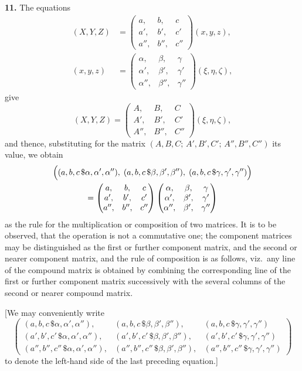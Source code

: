 \documentclass[12pt,a4paper]{article}
\theoremstyle{definition}
\begin{document}
\medskip
\noindent\textbf{11.} The equations
\begin{align*}
(X,Y,Z) &= \begin{pmatrix} a, & b, & c \\ a', & b', & c' \\ a'', & b'', & c'' \end{pmatrix}(x,y,z), \\
(x,y,z) &= \begin{pmatrix} \alpha, & \beta, & \gamma \\ \alpha', & \beta', & \gamma' \\ \alpha'', & \beta'', & \gamma'' \end{pmatrix}(\xi,\eta,\zeta),
\end{align*}
give
\[
(X,Y,Z) = \begin{pmatrix} A, & B, & C \\ A', & B', & C' \\ A'', & B'', & C'' \end{pmatrix}(\xi,\eta,\zeta),
\]
and thence, substituting for the matrix $(A,B,C;\, A',B',C';\, A'',B'',C'')$ its value, we obtain
\begin{multline*}
\Bigl((a,b,c\,\$\alpha,\alpha',\alpha''),\; (a,b,c\,\$\beta,\beta',\beta''),\; (a,b,c\,\$\gamma,\gamma',\gamma'')\Bigr) \\
= \begin{pmatrix} a, & b, & c \\ a', & b', & c' \\ a'', & b'', & c'' \end{pmatrix}
\begin{pmatrix} \alpha, & \beta, & \gamma \\ \alpha', & \beta', & \gamma' \\ \alpha'', & \beta', & \gamma'' \end{pmatrix}
\end{multline*}
as the rule for the multiplication or composition of two matrices. It is to be observed, that the operation is not a commutative one; the component matrices may be distinguished as the first or further component matrix, and the second or nearer component matrix, and the rule of composition is as follows, viz.\ any line of the compound matrix is obtained by combining the corresponding line of the first or further component matrix successively with the several columns of the second or nearer compound matrix.

[We may conveniently write
\[
\begin{pmatrix}
(a,b,c\,\$\alpha,\alpha',\alpha''), & (a,b,c\,\$\beta,\beta',\beta''), & (a,b,c\,\$\gamma,\gamma',\gamma'') \\
(a',b',c'\,\$\alpha,\alpha',\alpha''), & (a',b',c'\,\$\beta,\beta',\beta''), & (a',b',c'\,\$\gamma,\gamma',\gamma'') \\
(a'',b'',c''\,\$\alpha,\alpha',\alpha''), & (a'',b'',c''\,\$\beta,\beta',\beta''), & (a'',b'',c''\,\$\gamma,\gamma',\gamma'')
\end{pmatrix}
\]
to denote the left-hand side of the last preceding equation.]
\end{document}
